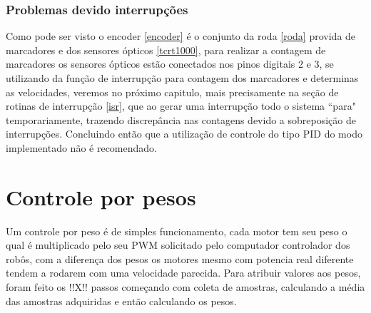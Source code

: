 \documentclass[a4paper,12pt,portuguese]{ufms-cpcx}
\begin{document}
\subsection{Problemas devido interrupções}
Como pode ser visto o encoder \ref{encoder} é o conjunto da roda \ref{roda} provida de marcadores e  dos sensores ópticos \ref{tcrt1000}, para realizar a contagem de marcadores os sensores ópticos estão conectados nos pinos digitais 2 e 3, se utilizando da função de interrupção para contagem dos marcadores e determinas as velocidades, veremos no próximo capitulo, mais precisamente na seção de rotinas de interrupção \ref{isr}, que ao gerar uma interrupção todo o sistema ``para" temporariamente, trazendo discrepância nas contagens devido a sobreposição de interrupções.
Concluindo então que a utilização de controle do tipo PID do modo implementado não é recomendado.

\chapter{Controle por pesos}
Um controle por peso é de simples funcionamento, cada motor tem seu peso o qual é multiplicado pelo seu PWM solicitado pelo computador controlador dos robôs, com a diferença dos pesos os motores mesmo com potencia real diferente tendem a rodarem com uma velocidade parecida. Para atribuir valores aos pesos, foram feito os !!X!! passos começando com coleta de amostras, calculando a média das amostras adquiridas e então calculando os pesos.
\end{document}
